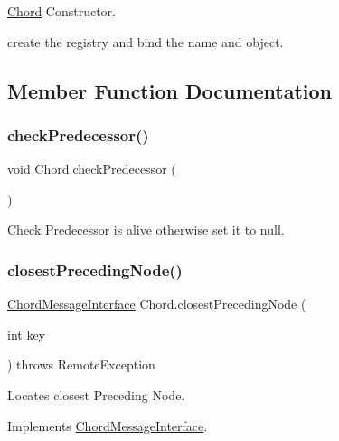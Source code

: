 \hyperlink{class_chord}{Chord} Constructor. 

create the registry and bind the name and object. 

\subsection{Member Function Documentation}
\hypertarget{class_chord_a530b2ab58c9f4026dadf4293c38c4450}{}\label{class_chord_a530b2ab58c9f4026dadf4293c38c4450} 
\subsubsection{\texorpdfstring{check\+Predecessor()}{checkPredecessor()}}
{\footnotesize\ttfamily void Chord.\+check\+Predecessor (\begin{DoxyParamCaption}{ }\end{DoxyParamCaption})}



Check Predecessor is alive otherwise set it to null. 

\hypertarget{class_chord_a77a9443c945cf5482f59edf685c1dc70}{}\label{class_chord_a77a9443c945cf5482f59edf685c1dc70} 
\subsubsection{\texorpdfstring{closest\+Preceding\+Node()}{closestPrecedingNode()}}
{\footnotesize\ttfamily \hyperlink{interface_chord_message_interface}{Chord\+Message\+Interface} Chord.\+closest\+Preceding\+Node (\begin{DoxyParamCaption}\item[{int}]{key }\end{DoxyParamCaption}) throws Remote\+Exception}



Locates closest Preceding Node. 



Implements \hyperlink{interface_chord_message_interface_a7f47e9d5144a2af6904135bc05dfe8fd}{Chord\+Message\+Interface}.

\hypertarget{class_chord_a83d9245c283baf440dc847cee154c8c6}{}\label{class_chord_a83d9245c283baf440dc847cee154c8c6} 
